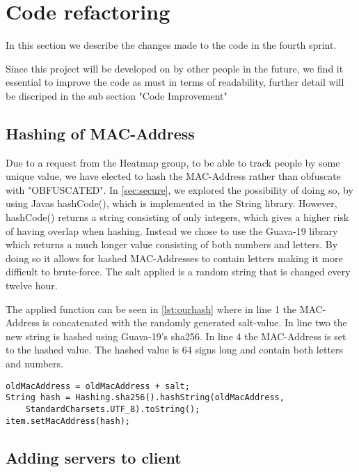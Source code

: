 \section{Code refactoring}
In this section we describe the changes made to the code in the fourth sprint.

Since this project will be developed on by other people in the future, we find it essential to improve the code as must in terms of readability, further detail will be discriped in the sub section "Code Improvement"

\subsection*{Hashing of MAC-Address}
Due to a request from the Heatmap group, to be able to track people by some unique value, we have elected to hash the MAC-Address rather than obfuscate with "OBFUSCATED". In \cref{sec:secure}, we explored the possibility of doing so, by using Javas hashCode(), which is implemented in the String library. However, hashCode() returns a string consisting of only integers, which gives a higher risk of having overlap when hashing. Instead we chose to use the Guava-19 library which returns a much longer value consisting of both numbers and letters. By doing so it allows for hashed MAC-Addresses to contain letters making it more difficult to brute-force. The salt applied is a random string that is changed every twelve hour. 

The applied function can be seen in \cref{lst:ourhash} where in line 1 the MAC-Address is concatenated with the randomly generated salt-value. In line two the new string is hashed using Guava-19's sha256. In line 4 the MAC-Address is set to the hashed value. The hashed value is 64 signs long and contain both letters and numbers.

\begin{lstlisting}[caption={Hashing a MAC-Address},label={lst:ourhash},language=inc_Java]
oldMacAddress = oldMacAddress + salt;
String hash = Hashing.sha256().hashString(oldMacAddress, 
	StandardCharsets.UTF_8).toString();
item.setMacAddress(hash);
\end{lstlisting}

\subsection*{Adding servers to client}

